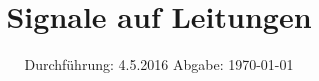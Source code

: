 

\subject{V52}
\title{Signale auf Leitungen}
\date{
  Durchführung: 4.5.2016
  \hspace{3em}
  Abgabe: \today
}



\maketitle
\thispagestyle{empty}
\tableofcontents
\newpage






\printbibliography

\appendix
%



